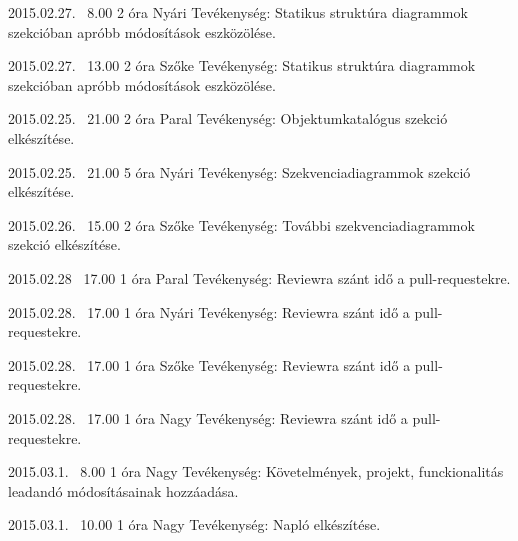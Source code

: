 \begin{naplo}
\bejegyzes
{2015.02.27. ~8.00}
{2 óra}
{Nyári} 
{Tevékenység: Statikus struktúra diagrammok szekcióban apróbb módosítások eszközölése.\newline } 

\bejegyzes
{2015.02.27. ~13.00}
{2 óra}
{Szőke} 
{Tevékenység: Statikus struktúra diagrammok szekcióban apróbb módosítások eszközölése.\newline } 

\bejegyzes
{2015.02.25. ~21.00}
{2 óra}
{Paral} 
{Tevékenység: Objektumkatalógus szekció elkészítése.\newline } 

\bejegyzes
{2015.02.25. ~21.00}
{5 óra}
{Nyári} 
{Tevékenység: Szekvenciadiagrammok szekció elkészítése.\newline } 

\bejegyzes
{2015.02.26. ~15.00}
{2 óra}
{Szőke} 
{Tevékenység: További szekvenciadiagrammok szekció elkészítése.\newline } 

\bejegyzes
{2015.02.28 ~17.00}
{1 óra}
{Paral} 
{Tevékenység: Reviewra szánt idő a pull-requestekre.\newline } 

\bejegyzes
{2015.02.28. ~17.00}
{1 óra}
{Nyári} 
{Tevékenység: Reviewra szánt idő a pull-requestekre.\newline } 

\bejegyzes
{2015.02.28. ~17.00}
{1 óra}
{Szőke} 
{Tevékenység: Reviewra szánt idő a pull-requestekre.\newline } 

\bejegyzes
{2015.02.28. ~17.00}
{1 óra}
{Nagy} 
{Tevékenység: Reviewra szánt idő a pull-requestekre.\newline } 

\bejegyzes
{2015.03.1. ~8.00}
{1 óra}
{Nagy} 
{Tevékenység: Követelmények, projekt, funckionalitás leadandó módosításainak hozzáadása.\newline } 

\bejegyzes
{2015.03.1. ~10.00}
{1 óra}
{Nagy} 
{Tevékenység: Napló elkészítése.\newline } 

\end{naplo}

